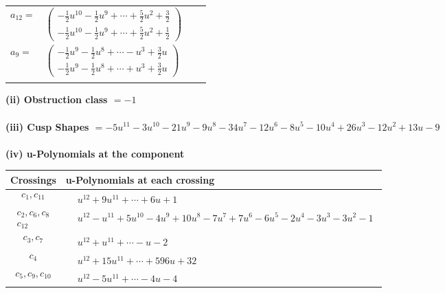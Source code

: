 \documentclass[1p]{elsarticle_modified}
\theoremstyle{definition}
\begin{document}
\begin{tabular}{m{7pt} m{180pt} m{7pt} m{180pt} }
\flushright $a_{12}=$&$\begin{pmatrix}-\frac{1}{2} u^{10}-\frac{1}{2} u^9+\cdots+\frac{5}{2} u^2+\frac{3}{2}\\-\frac{1}{2} u^{10}-\frac{1}{2} u^9+\cdots+\frac{5}{2} u^2+\frac{1}{2}\end{pmatrix}$ \\
\flushright $a_{9}=$&$\begin{pmatrix}-\frac{1}{2} u^9-\frac{1}{2} u^8+\cdots- u^3+\frac{3}{2} u\\-\frac{1}{2} u^9-\frac{1}{2} u^8+\cdots+u^3+\frac{3}{2} u\end{pmatrix}$\\&\end{tabular}
\flushleft \textbf{(ii) Obstruction class $= -1$}\\~\\
\flushleft \textbf{(iii) Cusp Shapes $= -5 u^{11}-3 u^{10}-21 u^9-9 u^8-34 u^7-12 u^6-8 u^5-10 u^4+26 u^3-12 u^2+13 u-9$}\\~\\
\newpage\renewcommand{\arraystretch}{1}
\flushleft \textbf{(iv) u-Polynomials at the component}\newline \\
\begin{tabular}{m{50pt}|m{274pt}}
Crossings & \hspace{64pt}u-Polynomials at each crossing \\
\hline $$\begin{aligned}c_{1},c_{11}\end{aligned}$$&$\begin{aligned}
&u^{12}+9 u^{11}+\cdots+6 u+1
\end{aligned}$\\
\hline $$\begin{aligned}c_{2},c_{6},c_{8}\\c_{12}\end{aligned}$$&$\begin{aligned}
&u^{12}- u^{11}+5 u^{10}-4 u^9+10 u^8-7 u^7+7 u^6-6 u^5-2 u^4-3 u^3-3 u^2-1
\end{aligned}$\\
\hline $$\begin{aligned}c_{3},c_{7}\end{aligned}$$&$\begin{aligned}
&u^{12}+u^{11}+\cdots- u-2
\end{aligned}$\\
\hline $$\begin{aligned}c_{4}\end{aligned}$$&$\begin{aligned}
&u^{12}+15 u^{11}+\cdots+596 u+32
\end{aligned}$\\
\hline $$\begin{aligned}c_{5},c_{9},c_{10}\end{aligned}$$&$\begin{aligned}
&u^{12}-5 u^{11}+\cdots-4 u-4
\end{aligned}$\\
\hline
\end{tabular}\\~\\
\end{document}
